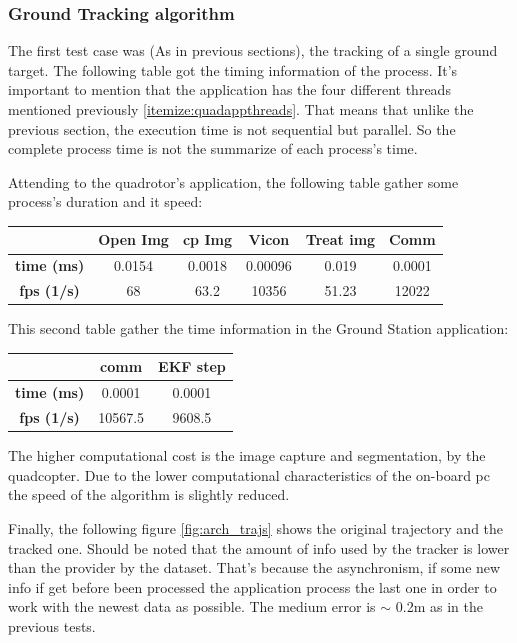 	
	\subsubsection{Ground Tracking algorithm}
	
	The first test case was (As in previous sections), the tracking of a single ground target. The following table got the timing information of the process. It's important to mention that the application has the four different threads mentioned previously \ref{itemize:quadappthreads}. That means that unlike the previous section, the execution time is not sequential but parallel. So the complete process time is not the summarize of each process's time.
	
	Attending to the quadrotor's application, the following table gather some process's duration and it speed:
	\newline
	\newline
	{
	\centering
		\begin{tabular}{|c|c|c|c|c|c|}
		\hline  					&  Open Img	&  cp Img 	& Vicon 	& Treat img & Comm  		\\ 
		\hline  \textbf{time (ms)}	& 	0.0154	& 0.0018	&	0.00096	&  	 0.019	&	0.0001		\\ 
		\hline  \textbf{fps (1/s)}	&  	68		&  63.2		&  10356	&  	51.23	&	12022		\\ 
		\hline 
		\end{tabular} 
	}
	\newline
	
	This second table gather the time information in the Ground Station application:
	\newline
	
	{
	\centering
		\begin{tabular}{|c|c|c|}
		\hline  					&  comm		&  EKF step	\\
		\hline  \textbf{time (ms)}	& 	0.0001	& 	0.0001	\\
		\hline  \textbf{fps (1/s)}	&  	10567.5	&  	9608.5	\\
		\hline 
		\end{tabular} 
	}
	\newline
	
	The higher computational cost is the image capture and segmentation, by the quadcopter. Due to the lower computational characteristics of the on-board pc the speed of the algorithm is slightly reduced.
	
	Finally, the following figure \ref{fig:arch_trajs} shows the original trajectory and the tracked one. Should be noted that the amount of info used by the tracker is lower than the provider by the dataset. That's because the asynchronism, if some new info if get before been processed the application process the last one in order to work with the newest data as possible. The medium error is $\sim$ 0.2m as in the previous tests.
	
